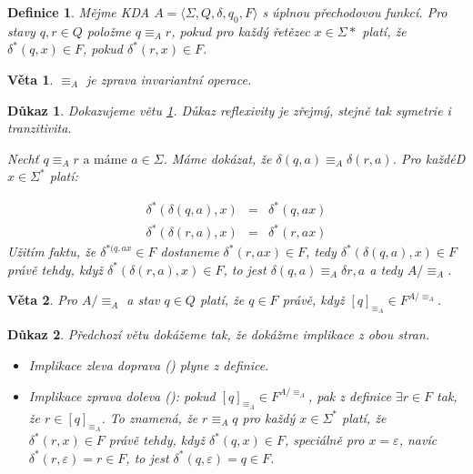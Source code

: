 \documentclass[10pt, a4paper, titlepage]{article}
\theoremstyle{note}
\newtheorem{veta}{\textbf{Věta}}
\newtheorem{definice}{\textbf{Definice}}
\newtheorem{dukaz}{\textbf{Důkaz}}
\begin{document}
\begin{definice}
Mějme KDA $A = \langle \Sigma, Q, \delta, q_{0}, F \rangle$ s úplnou přechodovou funkcí.
Pro stavy $q, r \in Q$ položme $q \equiv_{A} r$, pokud pro každ\'y řetězec $x \in \Sigma{*}$ plat\'i, že $\delta^{*}(q,x) \in F$,
pokud $\delta^{*}(r,x) \in F$.
\end{definice}

\begin{veta}\label{veta-zprava}
$\equiv_{A}$ je zprava invariantní operace.
\end{veta}

\begin{dukaz}
Dokazujeme větu \ref{veta-zprava}. Důkaz reflexivity je zřejm\'y, stejně tak symetrie i tranzitivita.

Nechť $q \equiv_{A} r \text{ a m\'ame } a \in \Sigma$. M\'ame dok\'azat, že $\delta(q,a) \equiv_{A} \delta(r,a)$. Pro každ\'eD
$x \in \Sigma^{*}$ plat\'i:

\begin{eqnarray*}
\delta^{*}(\delta(q,a), x) &=& \delta^{*}(q, ax) \\
\delta^{*}(\delta(r,a), x) &=& \delta^{*}(r, ax)
\end{eqnarray*}
Užit\'im faktu, že $\delta^{*(q, ax} \in F$ dostaneme $\delta^{*}(r,ax) \in F$, tedy
$\delta^{*}(\delta(q,a),x) \in F$ pr\'avě tehdy, když $\delta^{*}(\delta(r,a),x) \in F$, to jest
$\delta(q,a) \equiv_{A} \delta{r, a}$ a tedy $A/ \equiv_{A}$.
\end{dukaz}

\begin{veta}\label{veta-4}
Pro $A/ \equiv_{A}$ a stav $q \in Q$ plat\'i, že $q \in F$ pr\'avě, když $[q]_{\equiv_{A}} \in F^{A/ \equiv_{A}}$.
\end{veta}

\begin{dukaz}
Předchoz\'i větu dok\'ažeme tak, že dok\'ažme implikace z obou stran.
\begin{itemize}
\item
Implikace zleva doprava (\uv{$\Rightarrow$}) plyne z definice.

\item
Implikace zprava doleva (\uv{$\Leftarrow$}): pokud $[q]_{\equiv_{A}} \in F^{A/ \equiv_{A}}$, pak z definice
$\exists r \in F$ tak, že $r \in [q]_{\equiv_{A}}$. To znamen\'a, že $r \equiv_{A} q$ pro každ\'y $x \in \Sigma^{*}$ plat\'i, že
$\delta^{*}(r,x) \in F$ pr\'avě tehdy, když $\delta^{*}(q,x) \in F$, speci\'alně pro $x = \varepsilon$, nav\'ic
$\delta^{*}(r, \varepsilon) = r \in F$, to jest $\delta^{*}(q,\varepsilon) = q \in F$.
\end{itemize}
\end{dukaz}
\end{document}
